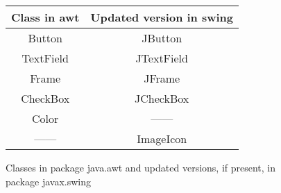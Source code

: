 





\begin {figure}

\begin {tabular} {c | c}
Class in awt   		&  Updated version in swing		\\
\hline
Button			&  JButton				\\
TextField		&  JTextField				\\
Frame 			&  JFrame 				\\
CheckBox		&  JCheckBox				\\
Color   		&  ------    				\\
------       		&  ImageIcon		
\end {tabular}


\caption {Classes in package java.awt and updated versions, if present,
in package javax.swing}

\label {fig:awtVsSwing}

\end {figure}


